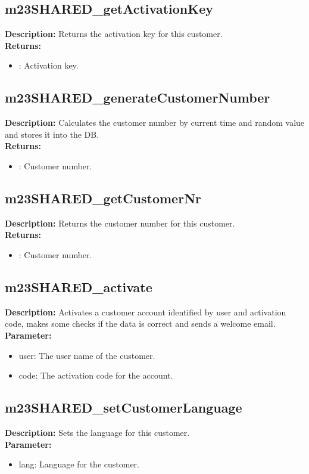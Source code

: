 \subsection{m23SHARED\_getActivationKey}
\textbf{Description:} Returns the activation key for this customer.\\
\textbf{Returns:}
\begin{itemize}
\item : Activation key.
\end{itemize}

\subsection{m23SHARED\_generateCustomerNumber}
\textbf{Description:} Calculates the customer number by current time and random value and stores it into the DB.\\
\textbf{Returns:}
\begin{itemize}
\item : Customer number.
\end{itemize}

\subsection{m23SHARED\_getCustomerNr}
\textbf{Description:} Returns the customer number for this customer.\\
\textbf{Returns:}
\begin{itemize}
\item : Customer number.
\end{itemize}

\subsection{m23SHARED\_activate}
\textbf{Description:} Activates a customer account identified by user and activation code, makes some checks if the data is correct and sends a welcome email.\\
\textbf{Parameter:}
\begin{itemize}
\item user: The user name of the customer.
\item code: The activation code for the account.
\end{itemize}

\subsection{m23SHARED\_setCustomerLanguage}
\textbf{Description:} Sets the language for this customer.\\
\textbf{Parameter:}
\begin{itemize}
\item lang: Language for the customer.
\end{itemize}

